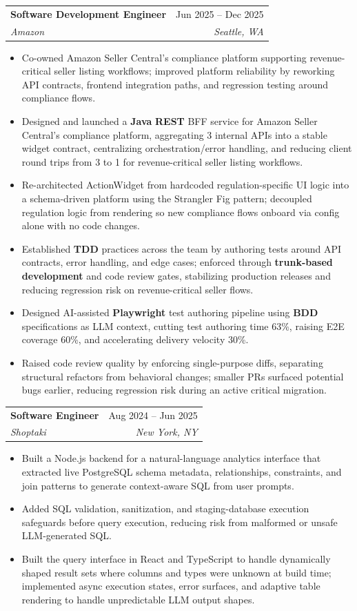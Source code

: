 \documentclass[letterpaper,10.5pt]{article}
\makeatletter
\newcommand{\resumeItem}[1]{
  \item\small{{#1 \vspace{-2pt}}}
}
\newcommand{\resumeSubheading}[4]{
  \vspace{-2pt}\item
    \begin{tabular*}{0.97\textwidth}[t]{l@{\extracolsep{\fill}}r}
      \textbf{#1} & #2 \\
      \textit{\small#3} & \textit{\small #4} \\
    \end{tabular*}\vspace{-7pt}
}
\newcommand{\resumeItemListStart}{\begin{itemize}}
\newcommand{\resumeItemListEnd}{\end{itemize}\vspace{-5pt}}
\makeatother
\begin{document}
    \resumeSubheading
      {Software Development Engineer}{Jun 2025 -- Dec 2025}
      {Amazon}{Seattle, WA}
      \resumeItemListStart
        \resumeItem{Co-owned Amazon Seller Central's compliance platform supporting revenue-critical seller listing workflows; improved platform reliability by reworking API contracts, frontend integration paths, and regression testing around compliance flows.}
        \resumeItem{Designed and launched a \textbf{Java} \textbf{REST} BFF service for Amazon Seller Central's compliance platform, aggregating 3 internal APIs into a stable widget contract, centralizing orchestration/error handling, and reducing client round trips from 3 to 1 for revenue-critical seller listing workflows.}
        \resumeItem{Re-architected ActionWidget from hardcoded regulation-specific UI logic into a schema-driven platform using the Strangler Fig pattern; decoupled regulation logic from rendering so new compliance flows onboard via config alone with no code changes.}
        \resumeItem{Established \textbf{TDD} practices across the team by authoring tests around API contracts, error handling, and edge cases; enforced through \textbf{trunk-based development} and code review gates, stabilizing production releases and reducing regression risk on revenue-critical seller flows.}
        \resumeItem{Designed AI-assisted \textbf{Playwright} test authoring pipeline using \textbf{BDD} specifications as LLM context, cutting test authoring time 63\%, raising E2E coverage 60\%, and accelerating delivery velocity 30\%.}
        \resumeItem{Raised code review quality by enforcing single-purpose diffs, separating structural refactors from behavioral changes; smaller PRs surfaced potential bugs earlier, reducing regression risk during an active critical migration.}
      \resumeItemListEnd
        
      \resumeSubheading
        {Software Engineer}{Aug 2024 -- Jun 2025}
        {Shoptaki}{New York, NY}
          \resumeItemListStart
        \resumeItem{Built a Node.js backend for a natural-language analytics interface that extracted live PostgreSQL schema metadata, relationships, constraints, and join patterns to generate context-aware SQL from user prompts.}
        \resumeItem{Added SQL validation, sanitization, and staging-database execution safeguards before query execution, reducing risk from malformed or unsafe LLM-generated SQL.}
        \resumeItem{Built the query interface in React and TypeScript to handle dynamically shaped result sets where columns and types were unknown at build time; implemented async execution states, error surfaces, and adaptive table rendering to handle unpredictable LLM output shapes.}
      \resumeItemListEnd
\end{document}
